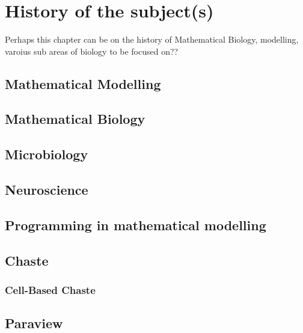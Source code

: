\chapter{History of the subject(s)}
Perhaps this chapter can be on the history of Mathematical Biology, modelling, varoius sub areas of biology to be focused on?? 
\section{Mathematical Modelling}
\section{Mathematical Biology}
\section{Microbiology}
\section{Neuroscience}
\section{Programming in mathematical modelling}
\section{Chaste}
\subsection{Cell-Based Chaste}
\section{Paraview}